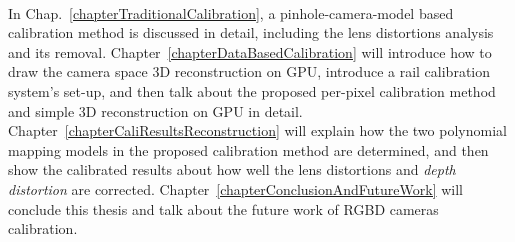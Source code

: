 \\\indent
In Chap.~\ref{chapterTraditionalCalibration}, a pinhole-camera-model based calibration method is discussed in detail, including the lens distortions analysis and its removal. Chapter~\ref{chapterDataBasedCalibration} will introduce how to draw the camera space \gls{3D} reconstruction on \gls{GPU}, introduce a rail calibration system's set-up, and then talk about the proposed per-pixel calibration method and simple \gls{3D} reconstruction on \gls{GPU} in detail. Chapter~\ref{chapterCaliResultsReconstruction} will explain how the two polynomial mapping models in the proposed calibration method are determined, and then show the calibrated results about how well the lens distortions and \emph{depth distortion} are corrected. Chapter~\ref{chapterConclusionAndFutureWork} will conclude this thesis and talk about the future work of \gls{RGBD} cameras calibration.



































































